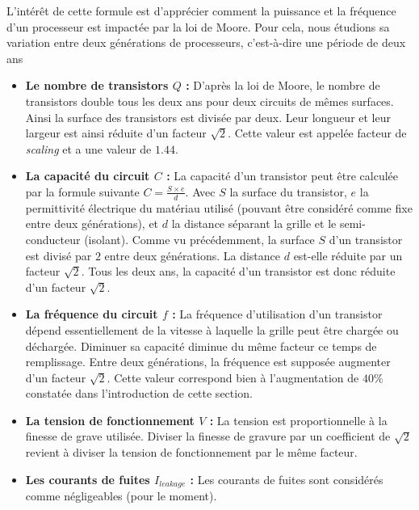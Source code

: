         
        L'intérêt de cette formule est d'apprécier comment la puissance et la fréquence d'un processeur est impactée par la loi de Moore. Pour cela, nous étudions sa variation entre deux générations de processeurs, c'est-à-dire une période de deux ans
        \begin{itemize}
        
            \item \textbf{Le nombre de transistors $Q$ : } D'après la loi de Moore, le nombre de transistors double tous les deux ans pour deux circuits de mêmes surfaces. Ainsi la surface des transistors est divisée par deux. Leur longueur et  leur largeur est ainsi réduite d'un facteur $\sqrt{2}$. Cette valeur est appelée facteur de \textit{scaling} et a une valeur de $1.44$.
            
            \item \textbf{La capacité du circuit $C$ : } La capacité d'un transistor peut être calculée par la formule suivante $C = \frac{S \times e}{d}$. Avec $S$ la surface du transistor, $e$ la permittivité électrique du matériau utilisé (pouvant être considéré comme fixe entre deux générations), et $d$ la distance séparant la grille et le semi-conducteur (isolant). Comme vu précédemment, la surface $S$ d'un transistor est divisé par $2$ entre deux générations. La distance $d$ est-elle réduite par un facteur $\sqrt{2}$. Tous les deux ans, la capacité d'un transistor est donc réduite d'un facteur $\sqrt{2}$. 
            
            \item \textbf{La fréquence du circuit $f$ : } La fréquence d'utilisation d'un transistor dépend essentiellement de la vitesse à laquelle la grille peut être chargée ou déchargée. Diminuer sa capacité diminue du même facteur ce temps de remplissage. Entre deux générations, la fréquence est supposée augmenter d'un facteur $\sqrt{2}$. Cette valeur correspond bien à l'augmentation de $40\%$ constatée dans l'introduction de cette section. 
            
            \item \textbf{La tension de fonctionnement $V$ : } La tension est proportionnelle à la finesse de grave utilisée. Diviser la finesse de gravure par un coefficient de $\sqrt{2}$ revient à diviser la tension de fonctionnement par le même facteur. 
            
            \item \textbf{Les courants de fuites $I_{leakage}$ : } Les courants de fuites sont considérés comme négligeables (pour le moment). 
        
        
        \end{itemize}
        
